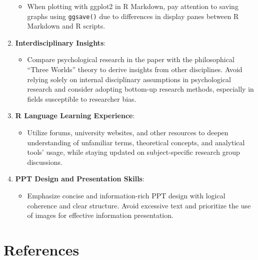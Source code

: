 \documentclass[
  man]{apa6}
\providecommand{\tightlist}{%
  \setlength{\itemsep}{0pt}\setlength{\parskip}{0pt}}
\begin{document}
\begin{enumerate}
  \begin{itemize}
  \tightlist
  \item
    When plotting with ggplot2 in R Markdown, pay attention to saving graphs using \texttt{ggsave()} due to differences in display panes between R Markdown and R scripts.
  \end{itemize}
\item
  \textbf{Interdisciplinary Insights}:

  \begin{itemize}
  \tightlist
  \item
    Compare psychological research in the paper with the philosophical ``Three Worlds'' theory to derive insights from other disciplines. Avoid relying solely on internal disciplinary assumptions in psychological research and consider adopting bottom-up research methods, especially in fields susceptible to researcher bias.
  \end{itemize}
\item
  \textbf{R Language Learning Experience}:

  \begin{itemize}
  \tightlist
  \item
    Utilize forums, university websites, and other resources to deepen understanding of unfamiliar terms, theoretical concepts, and analytical tools' usage, while staying updated on subject-specific research group discussions.
  \end{itemize}
\item
  \textbf{PPT Design and Presentation Skills}:

  \begin{itemize}
  \tightlist
  \item
    Emphasize concise and information-rich PPT design with logical coherence and clear structure. Avoid excessive text and prioritize the use of images for effective information presentation.
  \end{itemize}
\end{enumerate}

\newpage

\hypertarget{references}{%
\section{References}\label{references}}
\end{document}

